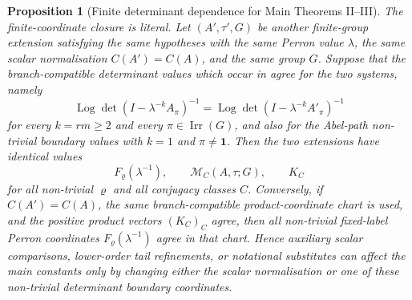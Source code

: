 \documentclass[11pt,a4paper]{amsart}
\theoremstyle{plain}
\newtheorem{proposition}[theorem]{Proposition}
\theoremstyle{definition}
\theoremstyle{remark}
\DeclareMathOperator{\Irr}{Irr}
\DeclareMathOperator{\Log}{Log}
\begin{document}
\begin{proposition}[Finite determinant dependence for Main Theorems II--III]
  The finite-coordinate closure is literal.  Let \((A',\tau',G)\) be another finite-group
  extension satisfying the same hypotheses with the same Perron value
  \(\lambda\), the same scalar normalisation \(C(A')=C(A)\), and the same
  group \(G\).  Suppose that the branch-compatible determinant values which
  occur in
   agree for the two systems,
  namely
  \[
    \Log\det(I-\lambda^{-k}A_\pi)^{-1}
    =
    \Log\det(I-\lambda^{-k}A'_\pi)^{-1}
  \]
  for every \(k=rm\ge2\) and every \(\pi\in\Irr(G)\), and also for the
  Abel-path non-trivial boundary values with \(k=1\) and
  \(\pi\ne\mathbf1\).  Then the two extensions have identical values
  \[
    F_\varrho(\lambda^{-1}),\qquad
    \mathcal M_C(A,\tau;G),
    \qquad K_C
  \]
  for all non-trivial \(\varrho\) and all conjugacy classes \(C\).  Conversely,
  if \(C(A')=C(A)\), the same branch-compatible product-coordinate chart is
  used, and the positive product vectors \((K_C)_C\) agree, then all
  non-trivial fixed-label Perron coordinates
  \(F_\varrho(\lambda^{-1})\) agree in that chart.  Hence auxiliary scalar
  comparisons, lower-order tail refinements, or notational substitutes can
  affect the main constants only by changing either the scalar normalisation or
  one of these non-trivial determinant boundary coordinates.
\end{proposition}
\end{document}
